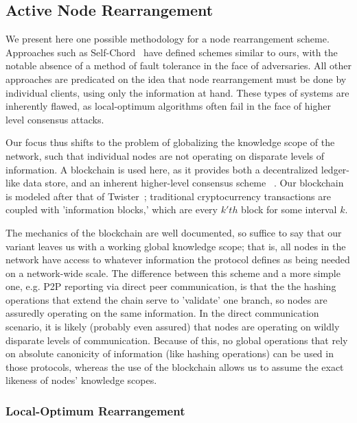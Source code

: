 \documentclass[10pt]{IEEEtran}
\begin{document}
\subsection{Active Node Rearrangement}

\par We present here one possible methodology for a node rearrangement scheme. Approaches such as Self-Chord~\cite{forestiero2009self} have defined schemes similar to ours, with the notable absence of a method of fault tolerance in the face of adversaries. All other approaches are predicated on the idea that node rearrangement must be done by individual clients, using only the information at hand. These types of systems are inherently flawed, as local-optimum algorithms often fail in the face of higher level consensus attacks.

\par Our focus thus shifts to the problem of globalizing the knowledge scope of the network, such that individual nodes are not operating on disparate levels of information. A blockchain is used here, as it provides both a decentralized ledger-like data store, and an inherent higher-level consensus scheme ~\cite{Nakamoto:2008ti}. Our blockchain is modeled after that of Twister~\cite{Freitas:2013tb}; traditional cryptocurrency transactions are coupled with 'information blocks,' which are every $k'th$ block for some interval $k$.

\par The mechanics of the blockchain are well documented, so suffice to say that our variant leaves us with a working global knowledge scope; that is, all nodes in the network have access to whatever information the protocol defines as being needed on a network-wide scale. The difference between this scheme and a more simple one, e.g. P2P reporting via direct peer communication, is that the the hashing operations that extend the chain serve to 'validate' one branch, so nodes are assuredly operating on the same information. In the direct communication scenario, it is likely (probably even assured) that nodes are operating on wildly disparate levels of communication. Because of this, no global operations that rely on absolute canonicity of information (like hashing operations) can be used in those protocols, whereas the use of the blockchain allows us to assume the exact likeness of nodes' knowledge scopes.

\subsubsection{Local-Optimum Rearrangement}
\end{document}
